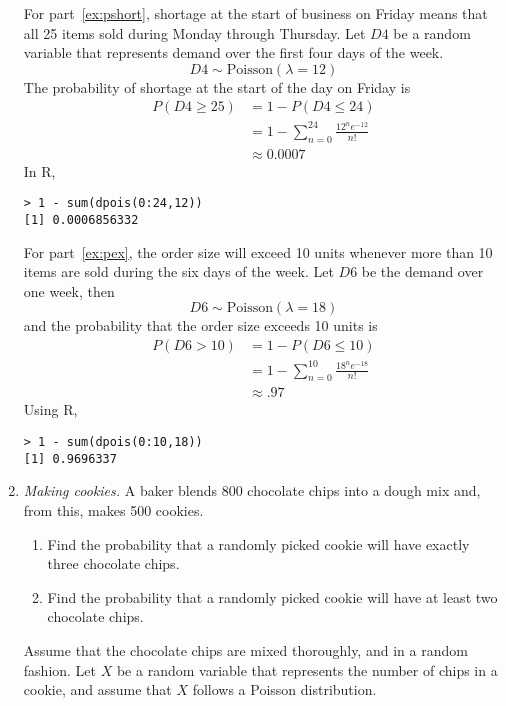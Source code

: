 \begin{enumerate}
\begin{solution}
For part~\ref{ex:pshort}, shortage at the start of business on Friday means
that all 25 items sold during Monday through Thursday. Let
$D4$ be a random variable that represents demand over the
first four days of the week.
\[ D4 \sim \text{Poisson}(\lambda = 12) \]
The probability of shortage at the start of the day on Friday is
\begin{align*}
  P(D4 \geq 25) &= 1 - P(D4 \leq 24)\\
                &= 1 - \sum_{n=0}^{24} \frac{12^n e^{-12}}{n!}\\
                &\approx 0.0007
\end{align*}
In R,
\begin{Verbatim}
> 1 - sum(dpois(0:24,12))
[1] 0.0006856332
\end{Verbatim}

For part~\ref{ex:pex}, the order size will exceed 10 units whenever more than
10 items are sold during the six days of the week. Let $D6$ be
the demand over one week, then
\[ D6 \sim \text{Poisson}(\lambda = 18) \]
and the probability that the order size exceeds 10 units is
\begin{align*}
  P(D6 > 10) &= 1 - P(D6 \leq 10) \\
             &= 1 - \sum_{n=0}^{10} \frac{18^n e^{-18}}{n!}\\
             &\approx .97
\end{align*}
Using R,
\begin{Verbatim}
> 1 - sum(dpois(0:10,18))
[1] 0.9696337
\end{Verbatim}
\end{solution}

\item \emph{Making cookies.} A baker blends 800 chocolate chips into a
  dough mix and, from this, makes 500 cookies.
\begin{enumerate}
\item Find the probability that a randomly picked cookie will have 
exactly three chocolate chips. \label{a}
\item Find the probability that a randomly picked cookie will have
  at least two chocolate chips. \label{b}
\end{enumerate}
Assume that the chocolate chips are mixed thoroughly,
and in a random fashion. Let $X$ be a random variable that represents
the number of chips in a cookie, and assume that $X$ follows a 
Poisson distribution.


\end{enumerate}
